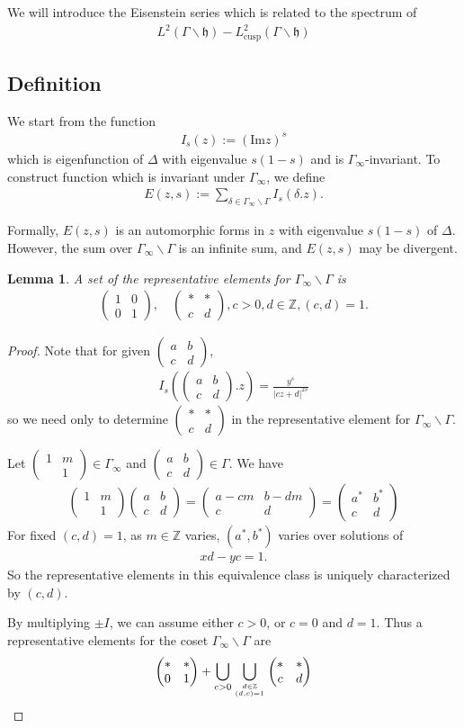 \documentclass[11pt,reqno]{amsart}
\newcommand{\bna}{\begin{eqnarray*}}
\newcommand{\ena}{\end{eqnarray*}}
\newcommand{\bma}{\begin{pmatrix}}
\newcommand{\ema}{\end{pmatrix}}
\newcommand{\mk}{\mathfrak}
\def\im{{\mathrm{Im}}}
\def\Z{\mathbb{Z}}
\newtheorem{lemma}{Lemma}[section]
\theoremstyle{definition}
\begin{document}
We will introduce the Eisenstein series which is related to the spectrum of
\bna
L^2(\Gamma\backslash \mk h)- L^2_{\mathrm{cusp}}(\Gamma\backslash \mk h)
\ena


\subsection{Definition}
We start from the function
\bna
I_s(z):=(\im z)^s
\ena
which is eigenfunction of $\Delta$ with eigenvalue $s(1-s)$ and is $\Gamma_\infty$-invariant.
To construct function which is invariant under $\Gamma_\infty$, we define
\bna
E(z,s):=\sum_{\delta\in\Gamma_\infty\backslash \Gamma}I_s(\delta.z).
\ena

Formally, $E(z,s)$ is an automorphic forms in $z$ with eigenvalue $s(1-s)$ of $\Delta$.
However, the sum over $\Gamma_\infty\backslash \Gamma$ is an infinite sum,
and $E(z,s)$ may be divergent.
\begin{lemma}\label{lemma-right-cosets}
A set of the representative elements for $\Gamma_\infty\backslash\Gamma$
is
\bna
\bma 1&0\\0&1\ema, \quad \bma *&*\\ c&d\ema, c>0, d\in\Z, (c,d)=1.
\ena
\end{lemma}
\begin{proof}
Note that for given $\bma a&b\\c&d\ema$,
\bna
I_s\left(\bma a&b\\c&d\ema.z\right)=\frac{y^s}{|cz+d|^{2s}}
\ena
so we need only to determine $\bma *&*\\ c&d\ema$ in the representative element
for $\Gamma_\infty\backslash \Gamma$.

Let $\bma 1&m\\&1\ema\in\Gamma_\infty$ and $\bma a&b\\c&d\ema\in\Gamma$. We have
\bna
\bma 1&m\\&1\ema\bma a&b\\c&d\ema
=\bma a-cm&b-dm\\ c&d\ema=\bma a^*&b^*\\c&d\ema
\ena
For fixed $(c,d)=1$, as $m\in\Z$ varies, $(a^*,b^*)$ varies over solutions of
\bna
xd-yc=1.
\ena
So the representative elements in this equivalence class is uniquely
 characterized by $(c,d)$.

By multiplying $\pm I$, we can assume either $c>0$, or $c=0$ and $d=1$.
Thus a representative elements for the  coset $\Gamma_\infty\backslash \Gamma$ are
\bna
\bma *&*\\0&1\ema +
\bigcup_{c> 0}\bigcup_{d\in\Z\atop{(d,c)=1}}\bma *&*\\ c&d\ema
\ena
\end{proof}
\end{document}
